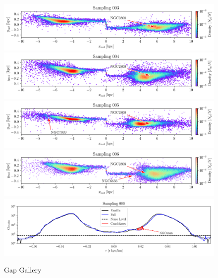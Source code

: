 \documentclass[draft]{aa}
\begin{document}
\begin{appendix}
    \begin{figure}
      \centering
      \includegraphics[width=\linewidth]{gallery_of_gaps_monte-carlo-003.png}      
      \includegraphics[width=\linewidth]{gallery_of_gaps_monte-carlo-004.png}
      \includegraphics[width=\linewidth]{gallery_of_gaps_monte-carlo-005.png}
      \includegraphics[width=\linewidth]{gallery_of_gaps_monte-carlo-006.png}
      \includegraphics[width=\linewidth]{tau-profile-monte-carlo-006.png}
      \caption{Gap Gallery}
      \label{fig:gallery1}
      \end{figure}        



\end{appendix}
\end{document}
